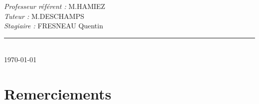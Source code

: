 \documentclass[a4paper,12pt]{extarticle}
\newcommand{\HRule}{\rule{\linewidth}{0.5mm}}
\begin{document}
\begin{titlepage}
\begin{sffamily}
\begin{center}
		\begin{minipage}{0.6\textwidth}
			\begin{flushleft} \large
			\begin{center}
				\emph{Professeur référent : }\textsf{M.HAMIEZ} \\
				\emph{Tuteur : }\textsf{M.DESCHAMPS} \\
				\emph{Stagiaire : }\textsf{FRESNEAU Quentin}
			\end{center}
			\end{flushleft}
		\end{minipage}
		
		\vfill
		\HRule\\[1cm]
		{\large \today}
		
		\end{center}
		\end{sffamily}
	\end{titlepage}
	\clearpage
	
	\tableofcontents
	
	\clearpage

	\section{Remerciements}
		\paragraph{}
\end{document}
